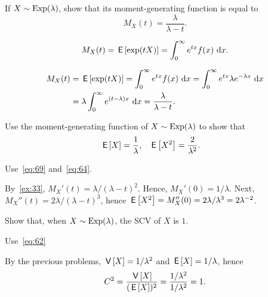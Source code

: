 \begin{extra}
 If $X\sim\operatorname{Exp}(\lambda)$, show that its moment-generating function is equal to
 \begin{equation*}
 M_X(t) = \frac{\lambda}{\lambda-t}.
 \end{equation*}
\begin{hint}
 \begin{equation*}
 M_X(t) = \,\mathsf{E}\left[\exp(t X)\right] =\int_0^\infty e^{t x} f(x) \,\,\text{d}x.
\end{equation*}
\end{hint}
\begin{solution}
 \begin{align*}
 M_X(t) &= \,\mathsf{E}\left[\exp(t X)\right] 
=\int_0^\infty e^{tx} f(x) \,\,\text{d}x 
=\int_0^\infty e^{tx} \lambda e^{-\lambda x} \,\,\text{d}x \\
&=\lambda \int_0^\infty e^{(t-\lambda)x} \,\,\text{d}x 
=\frac{\lambda}{\lambda -t}.
 \end{align*}
\end{solution}
\end{extra}

\begin{exercise}
Use the moment-generating function of $X\sim\operatorname{Exp}(\lambda)$ to show that
 \begin{align*}
 \,\mathsf{E}\left[X\right] &=\frac1\lambda, & 
 \,\mathsf{E}\left[X^2\right] &=\frac2{\lambda^2}.
 \end{align*}
\begin{hint}
Use~\cref{eq:69} and~\cref{eq:64}.
\end{hint}
\begin{solution} By~\cref{ex:33}, 
 $ M_X'(t)=\lambda/(\lambda-t)^2$. Hence, $M_X'(0)=1/\lambda$. Next, $M_X''(t)=2\lambda/(\lambda-t)^3$, hence $\,\mathsf{E}\left[X^2\right]=M_X''(0)=2\lambda/\lambda^3=2\lambda^{-2}$. 
\end{solution}
\end{exercise}

\begin{extra}
Show that, when $X\sim\operatorname{Exp}(\lambda)$,  the SCV of $X$  is $1$.
\begin{hint}
 Use~\cref{eq:62} 
\end{hint}
\begin{solution}
 By the previous problems, $\,\mathsf{V}\left[X\right] = 1/\lambda^2$ and $\,\mathsf{E}\left[X\right]=1/\lambda$, hence
 \begin{equation*}
 C^2= \frac{\,\mathsf{V}\left[X\right]}{(\,\mathsf{E}\left[X\right])^2} = \frac{1/\lambda^2}{1/\lambda^2} = 1.
 \end{equation*}
\end{solution}
\end{extra}

